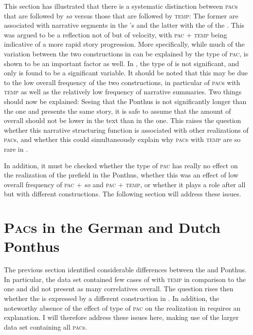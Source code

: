\documentclass[output=paper,colorlinks,citecolor=brown]{langscibook}
\begin{document}
This section has illustrated that there is a systematic distinction between \textsc{pac}s that are followed by \textit{so} versus those that are followed by \textsc{temp}: The former are associated with narrative segments in the 's  and the latter with the  of the . This was argued to be a reflection not of  but of velocity, with \textsc{pac} + \textsc{temp} being indicative of a more rapid story progression. More specifically, while much of the variation between the two constructions in  can be explained by the type of \textsc{pac},  is shown to be an important factor as well. In , the type of  is not significant, and only  is found to be a significant variable. It should be noted that this may be due to the low overall frequency of the two constructions, in particular of \textsc{pac}s with \textsc{temp} as well as the relatively low frequency of narrative summaries. Two things should now be explained: 
Seeing that the  Ponthus is not significantly longer than the  one and presents the same story, it is safe to assume that the amount of  overall should not be lower in the  text than in the  one. This raises the question whether this narrative structuring function is associated with other realizations of \textsc{pac}s, and whether this could simultaneously explain why \textsc{pac}s with \textsc{temp} are so rare in .

In addition, it must be checked whether the type of \textsc{pac} has really no effect on the realization of the prefield in the  Ponthus, whether this was an effect of low overall frequency of \textsc{pac} + \textit{so} and \textsc{pac} + \textsc{temp}, or whether it plays a role after all but with different constructions. The following section will address these issues.


\section{\textsc{Pac}s in the German and Dutch Ponthus}\label{sec:5}
The previous section identified considerable differences between the  and  Ponthus. In particular, the  data set contained few cases of  with \textsc{temp} in comparison to the  one and did not present as many correlatives overall. The question rises then whether the  is expressed by a different construction in . In addition, the noteworthy absence of the effect of type of \textsc{pac} on the realization in  requires an explanation. I will therefore address these issues here, making use of the larger data set containing all \textsc{pac}s.
\end{document}
